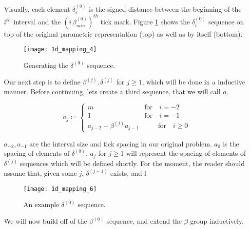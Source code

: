Visually, each element $\delta^{(0)}_i$ is the signed distance between the beginning of the $i^{th}$ interval and the $(i \, \beta^{(0)}_{min})^{th}$ tick mark. Figure \ref{fig:delta-sequence} shows the $\delta^{(0)}_i$ sequence on top of the original parametric representation (top) as well as by itself (bottom).

\begin{figure}[H]
  \begin{center}
    \texttt{[image: 1d\_mapping\_4]}
  \end{center}
  \vspace{-.2in} %
  \caption{\label{fig:delta-sequence} Generating the $\delta^{(0)}$ sequence.}
\end{figure}

Our next step is to define $\beta^{(j)}, \delta^{(j)}$ for $j \ge 1$, which will be done in a inductive manner. Before continuing, lets create a third sequence, that we will call $a$.

\begin{definition}
  \begin{equation}
    a_j \coloneqq \begin{cases}
      m \qquad &\text{for} \quad i = -2\\
      1 \qquad &\text{for} \quad i = -1\\
      a_{j-2} - \beta^{(j)} a_{j-1} &\qquad \text{for} \quad i \ge 0
    \end{cases}
  \end{equation}
\end{definition}

$a_{-2}, a_{-1}$ are the interval size and tick spacing in our original problem. $a_0$ is the spacing of elements of $\delta^{(0)}$. $a_j$ for $j \ge 1$ will represent the spacing of elements of $\delta^{(j)}$ sequences which will be defined shortly. For the moment, the reader should assume that, given some $j$, $\delta^{(j-1)}$ exists, and l

\begin{figure}[H]
  \begin{center}
    \texttt{[image: 1d\_mapping\_6]}
  \end{center}
  \vspace{-.2in} %
  \caption{\label{fig:delta-sequence-2} An example $\delta^{(0)}$ sequence.}
\end{figure}

We will now build off of the $\beta^{(0)}$ sequence, and extend the $\beta$ group inductively.

